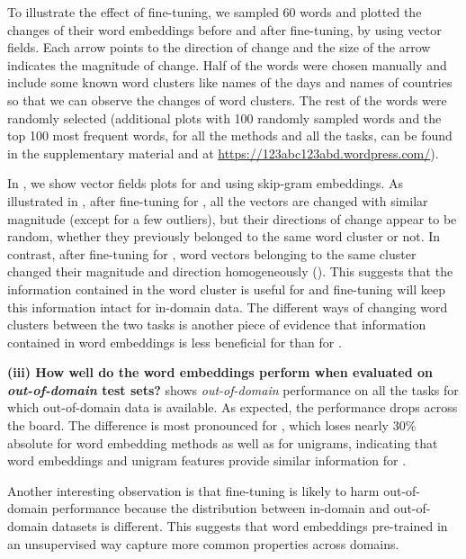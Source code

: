 To illustrate the effect of fine-tuning, we sampled 60 words and plotted the changes of their word embeddings before and after fine-tuning, by using vector fields. Each arrow points to the direction of change and the size of the arrow indicates the magnitude of change.  Half of the words were chosen manually and include some known word clusters like names of the days and names of countries so that we can observe the changes of word clusters.  The rest of the words were randomly selected (additional plots with 100 randomly sampled words and the top 100 most frequent words, for all the methods and all the tasks, can be found in the supplementary material and at \url{https://123abc123abd.wordpress.com/}).

In , we show vector fields plots for \chunking and \ner using skip-gram embeddings.
As illustrated in , after fine-tuning for \chunking, all the vectors are changed with similar magnitude 
(except for a few outliers), but their directions of change appear to be random, 
whether they previously belonged to the same word cluster or not. 
In contrast, after fine-tuning for \ner, word vectors belonging to the same cluster changed their magnitude and direction homogeneously (). This suggests that the information contained in the word cluster is useful for \ner and fine-tuning will keep this information intact for in-domain data.
The different ways of changing word clusters between the two tasks is another piece of evidence that information contained in word embeddings is less beneficial for \chunking than for \ner. 


\textbf{(iii) How well do the word embeddings perform when evaluated on \textit{out-of-domain} test sets?}
 shows \textit{out-of-domain} performance on all the tasks for which out-of-domain data is available.
As expected, the performance drops across the board. The difference is most pronounced for \chunking, which loses nearly 30\% absolute for word embedding methods as well as for unigrams, 
indicating that word embeddings and unigram features provide similar information 
for \chunking. 


Another interesting observation is that fine-tuning is likely to harm out-of-domain performance because the distribution between in-domain and out-of-domain datasets is different. This suggests that word embeddings pre-trained in an unsupervised way capture more common properties across domains. 


